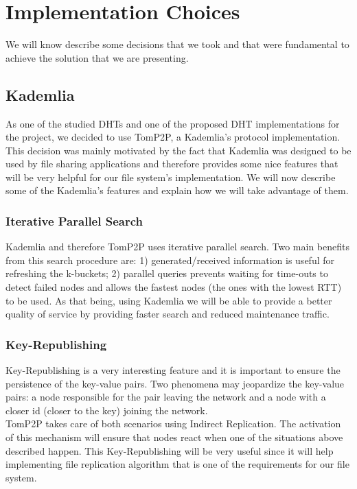 \documentclass[times,9pt,article]{llncs}
\begin{document}
\section{Implementation Choices}

We will know describe some decisions that we took and that were fundamental to achieve the solution that we are presenting.

\subsection{Kademlia}
As one of the studied DHTs and one of the proposed DHT implementations for the project, we decided to use TomP2P, a Kademlia's protocol implementation.\\
This decision was mainly motivated by the fact that Kademlia was designed to be used by file sharing applications and therefore provides some nice features that will be very helpful for our file system's implementation. We will now describe  some of the Kademlia's features and explain how we will take advantage of them.

\subsubsection{Iterative Parallel Search}
Kademlia and therefore TomP2P uses iterative parallel search. Two main benefits from this search procedure are: 1) generated/received information is useful for  refreshing the k-buckets; 2) parallel queries prevents waiting for time-outs to  detect failed nodes and allows the fastest nodes (the ones with the lowest RTT)  to be used. As that being, using Kademlia we will be able to provide a better  quality of service by providing faster search and reduced maintenance traffic.

\subsubsection{Key-Republishing}
Key-Republishing is a very interesting feature and it is important to ensure the  persistence of the key-value pairs. Two phenomena may jeopardize the key-value pairs: a node responsible for the pair leaving the network and a node with a closer id (closer to the key) joining the network. \\
TomP2P takes care of both scenarios using Indirect Replication. The activation of this mechanism will ensure that nodes react when one of the situations above described happen. This Key-Republishing will be very useful since it will help implementing file replication algorithm that is one of the requirements for our file system.
\end{document}
